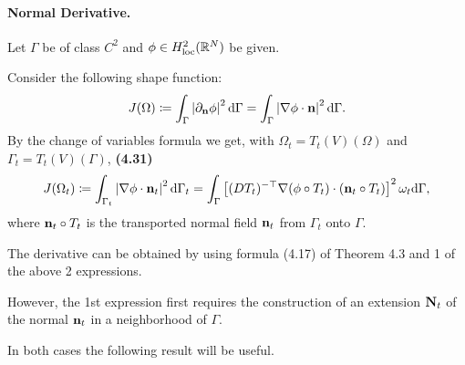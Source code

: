 \documentclass[oneside]{book}
\numberwithin{equation}{section}
\begin{document}
\paragraph{Normal Derivative.} Let $\Gamma$ be of class $C^2$ and $\phi\in H_{\rm loc}^2(\mathbb{R}^N)$ be given.

Consider the following shape function:
\begin{align*}
    J(\Omega)\coloneqq\int_\Gamma \left|\partial_{\bf n}\phi\right|^2{\rm d}\Gamma = \int_\Gamma \left|\nabla\phi\cdot{\bf n}\right|^2{\rm d}\Gamma.
\end{align*}
By the change of variables formula we get, with $\Omega_t = T_t(V)(\Omega)$ and $\Gamma_t = T_t(V)(\Gamma)$, \textbf{(4.31)}
\begin{align*}
    J(\Omega_t)\coloneqq\int_{\Gamma_t} \left|\nabla\phi\cdot{\bf n}_t\right|^2{\rm d}\Gamma_t = \int_\Gamma \left[(DT_t)^{-\top}\nabla(\phi\circ T_t)\cdot({\bf n}_t\circ T_t)\right]^2\omega_t{\rm d}\Gamma,
\end{align*}
where ${\bf n}_t\circ T_t$ is the transported normal field ${\bf n}_t$ from $\Gamma_t$ onto $\Gamma$.

The derivative can be obtained by using formula (4.17) of Theorem 4.3 and 1 of the above 2 expressions.

However, the 1st expression first requires the construction of an extension ${\bf N}_t$ of the normal ${\bf n}_t$ in a neighborhood of $\Gamma$.

In both cases the following result will be useful.
\end{document}
